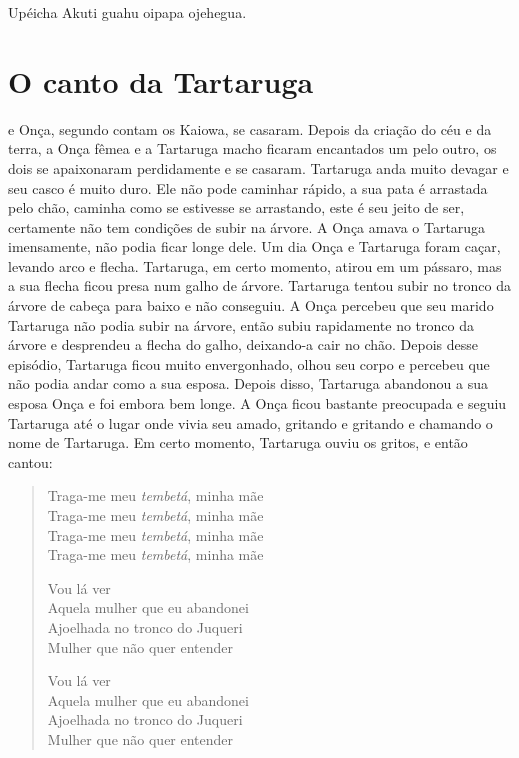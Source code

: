 Upéicha Akuti guahu oipapa ojehegua.

\chapter{O canto da Tartaruga}

 e Onça, segundo contam os Kaiowa, se casaram. Depois da
criação do céu e da terra, a Onça fêmea e a Tartaruga macho ficaram
encantados um pelo outro, os dois se apaixonaram perdidamente e se
casaram. Tartaruga anda muito devagar e seu casco é muito duro. Ele não
pode caminhar rápido, a sua pata é arrastada pelo chão, caminha como se
estivesse se arrastando, este é seu jeito de ser, certamente não tem
condições de subir na árvore. A Onça amava o Tartaruga imensamente, não
podia ficar longe dele. Um dia Onça e Tartaruga foram caçar, levando
arco e flecha. Tartaruga, em certo momento, atirou em um pássaro, mas a
sua flecha ficou presa num galho de árvore. Tartaruga tentou subir no
tronco da árvore de cabeça para baixo e não conseguiu. A Onça percebeu
que seu marido Tartaruga não podia subir na árvore, então subiu
rapidamente no tronco da árvore e desprendeu a flecha do galho,
deixando-a cair no chão. Depois desse episódio, Tartaruga ficou muito
envergonhado, olhou seu corpo e percebeu que não podia andar como a sua
esposa. Depois disso, Tartaruga abandonou a sua esposa Onça e foi embora
bem longe. A Onça ficou bastante preocupada e seguiu Tartaruga até o
lugar onde vivia seu amado, gritando e gritando e chamando o nome de
Tartaruga. Em certo momento, Tartaruga ouviu os gritos, e então cantou:

\begin{verse}
Traga-me meu \textit{tembetá}, minha mãe\\
Traga-me meu \textit{tembetá}, minha mãe\\
Traga-me meu \textit{tembetá}, minha mãe\\
Traga-me meu \textit{tembetá}, minha mãe

\pagebreak
Vou lá ver\\
Aquela mulher que eu abandonei\\
Ajoelhada no tronco do Juqueri\footnotemark{}\\
Mulher que não quer entender

Vou lá ver\\
Aquela mulher que eu abandonei\\
Ajoelhada no tronco do Juqueri\\
Mulher que não quer entender
\end{verse}

